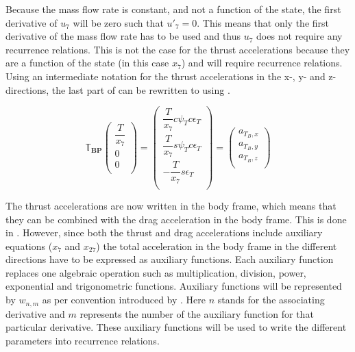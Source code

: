 Because the mass flow rate is constant, and not a function of the state, the first derivative of $u_{7}$ will be zero such that $u'_{7}=0$. This means that only the first derivative of the mass flow rate has to be used and thus $u_{7}$ does not require any recurrence relations. This is not the case for the thrust accelerations because they are a function of the state (in this case $x_{7}$) and will require recurrence relations. Using an intermediate notation for the thrust accelerations in the x-, y- and z-directions, the last part of  can be rewritten to  using .

\begin{equation} \label{eq:aTB}
\mathbb{T}_{\mathbf{BP}}
\begin{pmatrix}
\dfrac{T}{x_{7}}\\
0\\
0\\
\end{pmatrix}
=
\begin{pmatrix}
\dfrac{T}{x_{7}}c\psi_{T}c\epsilon_{T}\\
\dfrac{T}{x_{7}}s\psi_{T}c\epsilon_{T}\\
-\dfrac{T}{x_{7}}s\epsilon_{T}\\
\end{pmatrix}
=
\begin{pmatrix}
a_{T_{B},x}\\
a_{T_{B},y}\\
a_{T_{B},z}\\
\end{pmatrix}
\end{equation}


The thrust accelerations are now written in the body frame, which means that they can be combined with the drag acceleration in the body frame. This is done in . However, since both the thrust and drag accelerations include auxiliary equations ($x_{7}$ and $x_{27}$) the total acceleration in the body frame in the different directions have to be expressed as auxiliary functions. Each auxiliary function replaces one algebraic operation such as multiplication, division, power, exponential and trigonometric functions. Auxiliary functions will be represented by $w_{n,m}$ as per convention introduced by \cite{scott2008high}. Here $n$ stands for the associating derivative and $m$ represents the number of the auxiliary function for that particular derivative. These auxiliary functions will be used to write the different parameters into recurrence relations.


